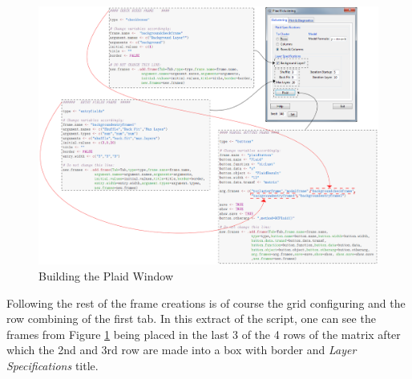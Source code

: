 \documentclass[a4paper]{article}\usepackage[]{graphicx}\usepackage[]{color}
\begin{document}
\begin{figure}[H]
\centering
\includegraphics[width=\linewidth]{figures/plaidbuilding.png}
\caption{Building the Plaid Window \label{plaidbuilding}}
\end{figure}
\noindent Following the rest of the frame creations is of course the grid
configuring and the row combining of the first tab. In this extract of the
script, one can see the frames from Figure \ref{plaidbuilding} being
placed in the last 3 of the 4 rows of the matrix after which the 2nd and 3rd row
are made into a box with border and {\it Layer Specifications} title.
\end{document}
